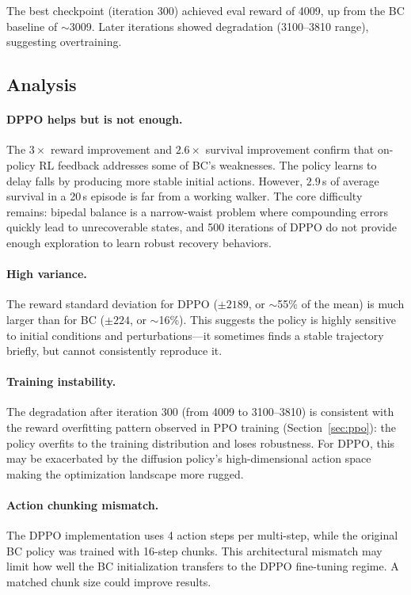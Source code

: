 \documentclass{article}
\begin{document}
The best checkpoint (iteration 300) achieved eval reward of 4009, up from the BC baseline of $\sim$3009. Later iterations showed degradation (3100--3810 range), suggesting overtraining.

\subsection{Analysis}

\paragraph{DPPO helps but is not enough.}
The $3\times$ reward improvement and $2.6\times$ survival improvement confirm that on-policy RL feedback addresses some of BC's weaknesses. The policy learns to delay falls by producing more stable initial actions. However, $2.9$\,s of average survival in a 20\,s episode is far from a working walker. The core difficulty remains: bipedal balance is a narrow-waist problem where compounding errors quickly lead to unrecoverable states, and 500 iterations of DPPO do not provide enough exploration to learn robust recovery behaviors.

\paragraph{High variance.}
The reward standard deviation for DPPO ($\pm 2189$, or $\sim$55\% of the mean) is much larger than for BC ($\pm 224$, or $\sim$16\%). This suggests the policy is highly sensitive to initial conditions and perturbations---it sometimes finds a stable trajectory briefly, but cannot consistently reproduce it.

\paragraph{Training instability.}
The degradation after iteration 300 (from 4009 to 3100--3810) is consistent with the reward overfitting pattern observed in PPO training (Section~\ref{sec:ppo}): the policy overfits to the training distribution and loses robustness. For DPPO, this may be exacerbated by the diffusion policy's high-dimensional action space making the optimization landscape more rugged.

\paragraph{Action chunking mismatch.}
The DPPO implementation uses 4 action steps per multi-step, while the original BC policy was trained with 16-step chunks. This architectural mismatch may limit how well the BC initialization transfers to the DPPO fine-tuning regime. A matched chunk size could improve results.
\end{document}
